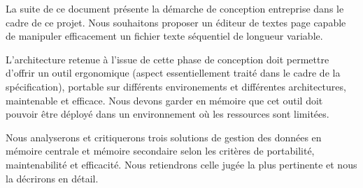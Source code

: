 La suite de ce document présente la démarche de conception entreprise dans le
cadre de ce projet. Nous souhaitons proposer un éditeur de textes page capable
de manipuler efficacement un fichier texte séquentiel de longueur variable.

L'architecture retenue à l'issue de cette phase de conception doit permettre
d'offrir un outil ergonomique (aspect essentiellement traité dans le cadre de
la spécification), portable sur différents environements et différentes architectures, maintenable et
efficace. Nous devons garder en mémoire que cet outil doit pouvoir être déployé
dans un environnement où les ressources sont limitées.

Nous analyserons et critiquerons trois solutions de gestion des données en
mémoire centrale et mémoire secondaire selon les critères de portabilité,
maintenabilité et efficacité. Nous retiendrons celle jugée la plus pertinente
et nous la décrirons en détail.
